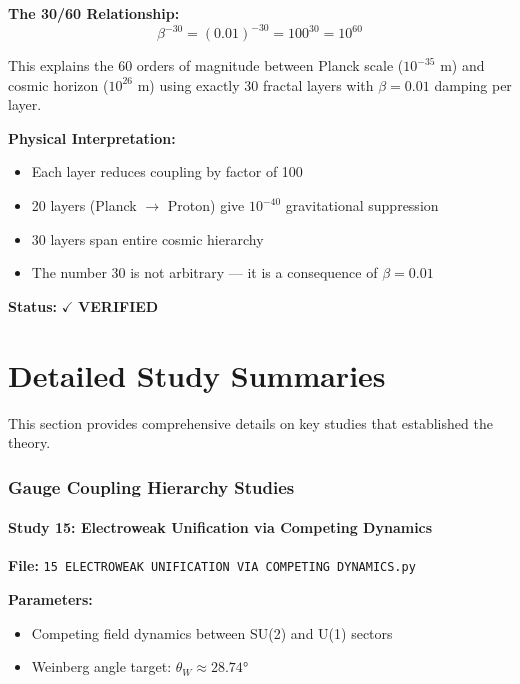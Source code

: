 \documentclass[11pt,a4paper]{book}
\theoremstyle{remark}
\begin{document}
\textbf{The 30/60 Relationship:}
\begin{equation}
\boxed{\beta^{-30} = (0.01)^{-30} = 100^{30} = 10^{60}}
\end{equation}

This explains the 60 orders of magnitude between Planck scale ($10^{-35}$ m) and cosmic horizon ($10^{26}$ m) using exactly 30 fractal layers with $\beta = 0.01$ damping per layer.

\textbf{Physical Interpretation:}
\begin{itemize}
    \item Each layer reduces coupling by factor of 100
    \item 20 layers (Planck $\to$ Proton) give $10^{-40}$ gravitational suppression
    \item 30 layers span entire cosmic hierarchy
    \item The number 30 is not arbitrary --- it is a consequence of $\beta = 0.01$
\end{itemize}

\textbf{Status:} $\checkmark$ \textbf{VERIFIED}

\newpage
\part{Detailed Study Summaries}

This section provides comprehensive details on key studies that established the theory.

\section{Gauge Coupling Hierarchy Studies}

\subsection{Study 15: Electroweak Unification via Competing Dynamics}

\textbf{File:} \texttt{15 ELECTROWEAK UNIFICATION VIA COMPETING DYNAMICS.py}

\textbf{Parameters:}
\begin{itemize}
    \item Competing field dynamics between SU(2) and U(1) sectors
    \item Weinberg angle target: $\theta_W \approx 28.74°$
\end{itemize}
\end{document}
